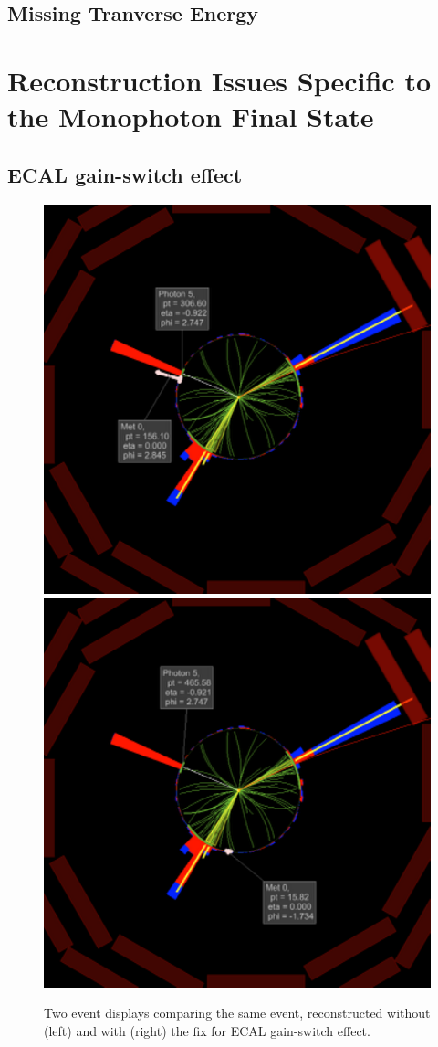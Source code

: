 \subsection{Missing Tranverse Energy}
\label{sec:pf_met}

\iffalse
\section{Reconstruction Issues Specific to the Monophoton Final State}
\label{sec:issues}

\subsection{ECAL gain-switch effect}
\label{sec:gainswitch}

\begin{figure}[htbp]
  \centering
  \includegraphics[width=0.48\linewidth]{Reconstruction/Figures/gsfix/evdisp_before.pdf}
  \includegraphics[width=0.48\linewidth]{Reconstruction/Figures/gsfix/evdisp_after.pdf}
  \caption{
    Two event displays comparing the same event, reconstructed without (left) and with (right) the fix for ECAL gain-switch effect.
  }
  \label{fig:eventdisplay_gsfix}
\end{figure}

